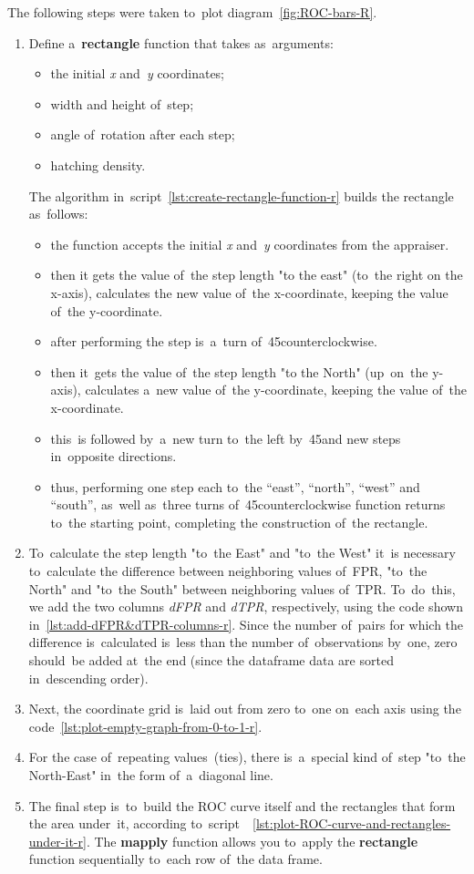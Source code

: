 \documentclass[]{scrreprt}
\begin{document}
The following steps were taken to~plot diagram~\ref{fig:ROC-bars-R}.
\begin{enumerate}
	\item Define a~\textbf{rectangle} function that takes as~arguments:
	\begin{itemize}
		\item the initial \emph{x} and~\emph{y} coordinates;
		\item width and height of~step;
		\item angle of~rotation after each step;
		\item hatching density.
	\end{itemize}
	The algorithm in~script~\ref{lst:create-rectangle-function-r} builds the rectangle as~follows:
	\begin{itemize}
		\item the function accepts the initial \emph{x} and~\emph{y} coordinates from the appraiser.
		\item then it gets the value of~the step length "to the east" (to~the right on the x-axis), calculates the new value of~the x-coordinate, keeping the value of~the y-coordinate.
		\item after performing the step is~a~turn of~45\textdegree counterclockwise.
		\item then it~gets the value of~the step length "to the North" (up~on~the y-axis), calculates a~new value of~the y-coordinate, keeping the value of~the x-coordinate.
		\item this~is followed by~a~new turn to~the left by~45\textdegree and new steps in~opposite directions.
		\item thus, performing one step each to~the “east”, “north”, “west” and “south”, as~well as~three turns of~45\textdegree counterclockwise function returns to~the starting point, completing the construction of~the rectangle.
	\end{itemize}
	\item To~calculate the step length "to~the East" and "to~the West" it~is necessary to~calculate the difference between neighboring values of~FPR, "to~the North" and "to~the South" between neighboring values of~TPR. To~do~this, we add the two columns \emph{dFPR} and \emph{dTPR}, respectively, using the code shown in~\ref{lst:add-dFPR&dTPR-columns-r}. Since the number of~pairs for which the difference is~calculated is~less than the number of~observations by~one, zero should~be added at~the end (since the dataframe data are sorted in~descending order).
	\item Next, the coordinate grid is~laid out from zero to~one on~each axis using the code~\ref{lst:plot-empty-graph-from-0-to-1-r}.
	\item For the case of~repeating values~(ties), there is~a~special kind of~step "to~the North-East" in~the form of~a~diagonal line.
	\item The final step is~to~build the ROC curve itself and the rectangles that form the area under~it, according to~script~~\ref{lst:plot-ROC-curve-and-rectangles-under-it-r}. The \textbf{mapply} function allows you to~apply the \textbf{rectangle} function sequentially to~each row of~the data frame.
\end{enumerate}
\end{document}
